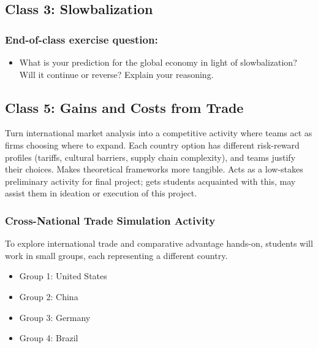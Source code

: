 \documentclass[
  11pt,
]{article}
\providecommand{\tightlist}{%
  \setlength{\itemsep}{0pt}\setlength{\parskip}{0pt}}
\begin{document}
\subsection{Class 3: Slowbalization}\label{class-3-slowbalization}

\subsubsection{End-of-class exercise
question:}\label{end-of-class-exercise-question-1}

\begin{itemize}
\tightlist
\item
  What is your prediction for the global economy in light of
  slowbalization? Will it continue or reverse? Explain your reasoning.
\end{itemize}

\subsection{Class 5: Gains and Costs from
Trade}\label{class-5-gains-and-costs-from-trade}

Turn international market analysis into a competitive activity where
teams act as firms choosing where to expand. Each country option has
different risk-reward profiles (tariffs, cultural barriers, supply chain
complexity), and teams justify their choices. Makes theoretical
frameworks more tangible. Acts as a low-stakes preliminary activity for
final project; gets students acquainted with this, may assist them in
ideation or execution of this project.

\subsubsection{Cross-National Trade Simulation
Activity}\label{cross-national-trade-simulation-activity}

To explore international trade and comparative advantage hands-on,
students will work in small groups, each representing a different
country.

\begin{itemize}
\tightlist
\item
  Group 1: United States\\
\item
  Group 2: China\\
\item
  Group 3: Germany\\
\item
  Group 4: Brazil
\end{itemize}
\end{document}
